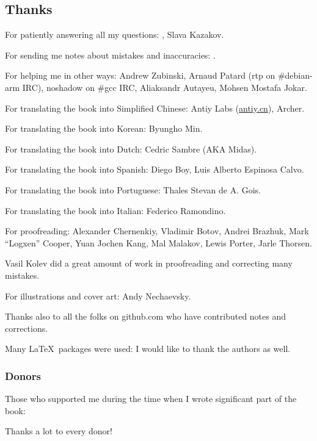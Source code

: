 \subsection*{Thanks}

For patiently answering all my questions: \HERMIT, Slava  Kazakov.

For sending me notes about mistakes and inaccuracies: \PeopleMistakesInaccuracies{}.

For helping me in other ways:
Andrew Zubinski,
Arnaud Patard (rtp on \#debian-arm IRC),
noshadow on \#gcc IRC,
Aliaksandr Autayeu,
Mohsen Mostafa Jokar.

For translating the book into Simplified Chinese:
Antiy Labs (\href{http://antiy.cn}{antiy.cn}), Archer.

For translating the book into Korean: Byungho Min.

For translating the book into Dutch: Cedric Sambre (AKA Midas).

For translating the book into Spanish: Diego Boy, Luis Alberto Espinosa Calvo.

For translating the book into Portuguese: Thales Stevan de A. Gois.

For translating the book into Italian: Federico Ramondino.

For proofreading:
Alexander  Chernenkiy,
Vladimir Botov,
Andrei Brazhuk,
Mark ``Logxen'' Cooper, Yuan Jochen Kang, Mal Malakov, Lewis Porter, Jarle Thorsen.

Vasil Kolev did a great amount of work in proofreading and correcting many mistakes.

For illustrations and cover art: Andy Nechaevsky.

Thanks also to all the folks on github.com who have contributed notes and corrections.

Many \LaTeX\ packages were used: I would like to thank the authors as well.

\subsubsection*{Donors}

Those who supported me during the time when I wrote significant part of the book:



Thanks a lot to every donor!
